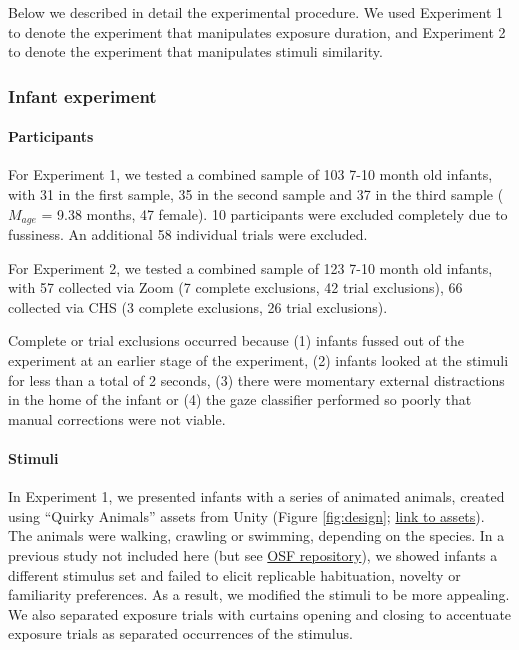 \documentclass[
]{article}
\begin{document}
Below we described in detail the experimental procedure. We used Experiment 1 to denote the experiment that manipulates exposure duration, and Experiment 2 to denote the experiment that manipulates stimuli similarity.

\hypertarget{infant-experiment-2}{%
\subsubsection{Infant experiment}\label{infant-experiment-2}}

\hypertarget{participants}{%
\paragraph{Participants}\label{participants}}

For Experiment 1, we tested a combined sample of 103 7-10 month old infants, with 31 in the first sample, 35 in the second sample and 37 in the third sample (\(M_{age}\) = 9.38 months, 47 female). 10 participants were excluded completely due to fussiness. An additional 58 individual trials were excluded.

For Experiment 2, we tested a combined sample of 123 7-10 month old infants, with 57 collected via Zoom (7 complete exclusions, 42 trial exclusions), 66 collected via CHS (3 complete exclusions, 26 trial exclusions).

Complete or trial exclusions occurred because (1) infants fussed out of the experiment at an earlier stage of the experiment, (2) infants looked at the stimuli for less than a total of 2 seconds, (3) there were momentary external distractions in the home of the infant or (4) the gaze classifier performed so poorly that manual corrections were not viable.

\hypertarget{stimuli}{%
\paragraph{Stimuli}\label{stimuli}}

In Experiment 1, we presented infants with a series of animated animals, created using ``Quirky Animals'' assets from Unity (Figure \ref{fig:design}; \href{https://tinyurl.com/469xxrn7}{link to assets}). The animals were walking, crawling or swimming, depending on the species. In a previous study not included here (but see \href{https://osf.io/b3xsk/?view_only=5beeb6ed27874ae3bfe586ee2b38381a}{OSF repository}), we showed infants a different stimulus set and failed to elicit replicable habituation, novelty or familiarity preferences. As a result, we modified the stimuli to be more appealing. We also separated exposure trials with curtains opening and closing to accentuate exposure trials as separated occurrences of the stimulus.
\end{document}
